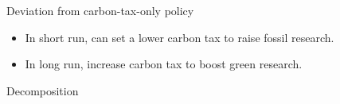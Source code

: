 \documentclass[11pt,aspectratio=169]{beamer}
\begin{document}
\begin{frame}{Deviation from carbon-tax-only policy}
\begin{figure}
\begin{subfigure}{0.4\textwidth}
				\end{subfigure}
			\end{figure}
			\vspace{3mm}
			\pause
			\begin{block}{}
				\begin{itemize}
					\item<+-> In short run, can set a lower carbon tax to raise fossil research.
					\item<+-> In long run, increase carbon tax to boost green research.
				\end{itemize}
			\end{block}	
		\end{frame}
		
		\begin{frame}{Decomposition}
			\pause
			\centering
			

\end{frame}
\end{document}
